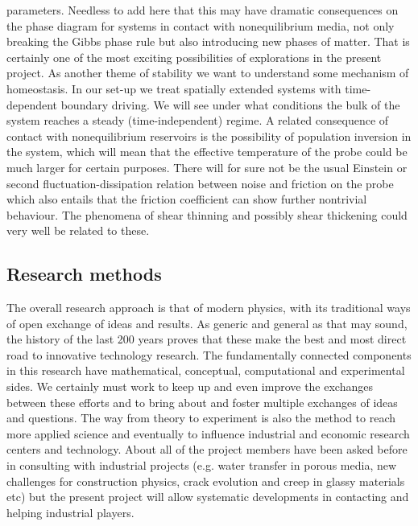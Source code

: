 parameters.  Needless to add here that this may have dramatic consequences on the phase
diagram for systems in contact with nonequilibrium media, not only breaking the Gibbs phase
rule but also introducing new phases of matter.  That is certainly one of the most exciting
possibilities of explorations in the present project. As another theme of stability we want
to understand some mechanism of homeostasis. In our set-up we treat spatially extended
systems with time-dependent boundary driving. We will see under what conditions the bulk of
the system reaches a steady (time-independent) regime. A related consequence of contact with
nonequilibrium reservoirs is the possibility of population inversion in the system, which
will mean that the effective temperature of the probe could be much larger for certain
purposes.  There will for sure not be the usual Einstein or second fluctuation-dissipation
relation between noise and friction on the probe which also entails that the friction
coefficient can show further nontrivial behaviour.  The phenomena of shear thinning and
possibly shear thickening could very well be related to these.
%


\subsection{Research methods}\label{sec:methods}

The overall research approach is that of modern physics, with its traditional ways of open
exchange of ideas and results.  As generic and general as that may sound, the history of the
last 200 years proves that these make the best and most direct road to innovative technology
research.  The fundamentally connected components in this research have mathematical,
conceptual, computational and experimental sides.
%
We certainly must work to keep up and even improve the exchanges between these efforts and
to bring about and foster multiple exchanges of ideas and questions.  The way from theory to
experiment is also the method to reach more applied science and eventually to influence
industrial and economic research centers and technology.  About all of the project members
have been asked before in consulting with industrial projects (e.g. water transfer in porous
media, new challenges for construction physics, crack evolution and creep in glassy
materials etc) but the present project will allow systematic developments in contacting and
helping industrial players.



